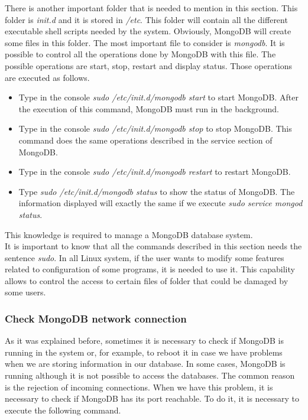 There is another important folder that is needed to mention in this section. This folder is \textit{init.d} and it is stored in \textit{/etc}. This folder will contain all the different executable shell scripts needed by the system. Obviously, MongoDB will create some files in this folder. The most important file to consider is \textit{mongodb}. It is possible to control all the operations done by MongoDB with this file. The possible operations are start, stop, restart and display status. Those operations are executed as follows.

\begin{itemize}

\item Type in the console \textit{sudo /etc/init.d/mongodb start} to start MongoDB. After the execution of this command, MongoDB must run in the background.

\item Type in the console \textit{sudo /etc/init.d/mongodb stop} to stop MongoDB. This command does the same operations described in the service section of MongoDB.

\item Type in the console \textit{sudo /etc/init.d/mongodb restart} to restart MongoDB.

\item Type \textit{sudo /etc/init.d/mongodb status} to show the status of MongoDB. The information displayed will exactly the same if we execute \textit{sudo service mongod status}.

\end{itemize}

This knowledge is required to manage a MongoDB database system.\\

It is important to know that all the commands described in this section needs the sentence \textit{sudo}. In all Linux system, if the user wants to modify some features related to configuration of some programs, it is needed to use it. This capability allows to control the access to certain files of folder that could be damaged by some users.

\subsubsection{Check MongoDB network connection}

As it was explained before, sometimes it is necessary to check if MongoDB is running in the system or, for example, to reboot it in case we have problems when we are storing information in our database. In some cases, MongoDB is running although it is not possible to access the databases. The common reason is the rejection of incoming connections. When we have this problem, it is necessary to check if MongoDB has its port reachable. To do it, it is necessary to execute the following command.\\

